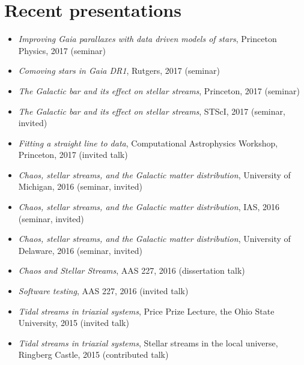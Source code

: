 \documentclass[12pt,letterpaper]{article}
\begin{document}
\section*{Recent presentations}

\begin{itemize}
    \item \emph{Improving Gaia parallaxes with data driven models of stars}, Princeton Physics, 2017 (seminar)
    \item \emph{Comoving stars in Gaia DR1}, Rutgers, 2017 (seminar)
    \item \emph{The Galactic bar and its effect on stellar streams}, Princeton, 2017 (seminar)
    \item \emph{The Galactic bar and its effect on stellar streams}, STScI, 2017 (seminar, invited)
    \item \emph{Fitting a straight line to data}, Computational Astrophysics Workshop, Princeton, 2017 (invited talk)
    \item \emph{Chaos, stellar streams, and the Galactic matter distribution}, University of Michigan, 2016 (seminar, invited)
    \item \emph{Chaos, stellar streams, and the Galactic matter distribution}, IAS, 2016 (seminar, invited)
    \item \emph{Chaos, stellar streams, and the Galactic matter distribution}, University of Delaware, 2016 (seminar, invited)
	\item \emph{Chaos and Stellar Streams}, AAS 227, 2016 (dissertation talk)
    \item \emph{Software testing}, AAS 227, 2016 (invited talk)
    \item \emph{Tidal streams in triaxial systems}, Price Prize Lecture, the Ohio State University, 2015 (invited talk)
	\item \emph{Tidal streams in triaxial systems}, Stellar streams in the local universe, Ringberg Castle, 2015 (contributed talk)

\end{itemize}
\end{document}
